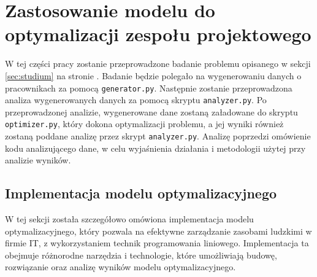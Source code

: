 \section{Zastosowanie modelu do optymalizacji zespołu projektowego}
\par W tej części pracy zostanie przeprowadzone badanie problemu opisanego w sekcji \ref{sec:studium} na stronie \pageref{sec:studium}. Badanie będzie polegało na wygenerowaniu danych o pracownikach za pomocą \verb|generator.py|. Następnie zostanie przeprowadzona analiza wygenerowanych danych za pomocą skryptu \verb|analyzer.py|. Po przeprowadzonej analizie, wygenerowane dane zostaną załadowane do skryptu \verb|optimizer.py|, który dokona optymalizacji problemu, a jej wyniki również zostaną poddane analizę przez skrypt \verb|analyzer.py|. Analizę poprzedzi omówienie kodu analizującego dane, w celu wyjaśnienia działania i metodologii użytej przy analizie wyników.
    
    \subsection{Implementacja modelu optymalizacyjnego}\label{subsec:optimizer_implementacja}
        \par W tej sekcji została szczegółowo omówiona implementacja modelu optymalizacyjnego, który pozwala na efektywne zarządzanie zasobami ludzkimi w firmie IT, z wykorzystaniem technik programowania liniowego. Implementacja ta obejmuje różnorodne narzędzia i technologie, które umożliwiają budowę, rozwiązanie oraz analizę wyników modelu optymalizacyjnego.
    

